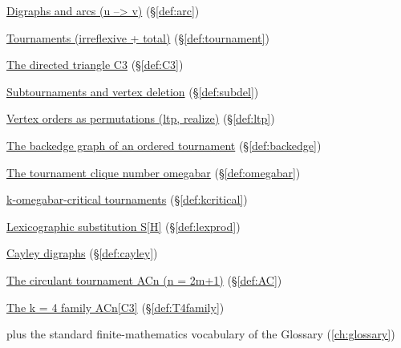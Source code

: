 \begin{closurepanel}
\item \hyperref[def:arc]{Digraphs and arcs (u --> v)} (\S\ref*{def:arc})
\item \hyperref[def:tournament]{Tournaments (irreflexive + total)} (\S\ref*{def:tournament})
\item \hyperref[def:C3]{The directed triangle C3} (\S\ref*{def:C3})
\item \hyperref[def:subdel]{Subtournaments and vertex deletion} (\S\ref*{def:subdel})
\item \hyperref[def:ltp]{Vertex orders as permutations (ltp, realize)} (\S\ref*{def:ltp})
\item \hyperref[def:backedge]{The backedge graph of an ordered tournament} (\S\ref*{def:backedge})
\item \hyperref[def:omegabar]{The tournament clique number omegabar} (\S\ref*{def:omegabar})
\item \hyperref[def:kcritical]{k-omegabar-critical tournaments} (\S\ref*{def:kcritical})
\item \hyperref[def:lexprod]{Lexicographic substitution S[H]} (\S\ref*{def:lexprod})
\item \hyperref[def:cayley]{Cayley digraphs} (\S\ref*{def:cayley})
\item \hyperref[def:AC]{The circulant tournament ACn (n = 2m+1)} (\S\ref*{def:AC})
\item \hyperref[def:T4family]{The k = 4 family ACn[C3]} (\S\ref*{def:T4family})
\item plus the standard finite-mathematics vocabulary of the Glossary (\cref{ch:glossary})
\end{closurepanel}
